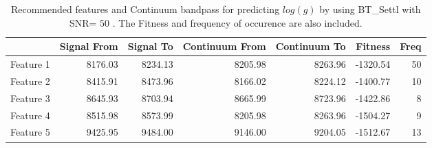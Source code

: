 \begin{table}
\begin{center}
\begin{tabular}{rrrrrrr}
  \hline
 & Signal From & Signal To & Continuum From & Continuum To & Fitness & Freq \\ 
  \hline
Feature 1 & 8176.03 & 8234.13 & 8205.98 & 8263.96 & -1320.54 &  50 \\ 
  Feature 2 & 8415.91 & 8473.96 & 8166.02 & 8224.12 & -1400.77 &  10 \\ 
  Feature 3 & 8645.93 & 8703.94 & 8665.99 & 8723.96 & -1422.86 &   8 \\ 
  Feature 4 & 8515.98 & 8573.99 & 8205.98 & 8263.96 & -1504.27 &   9 \\ 
  Feature 5 & 9425.95 & 9484.00 & 9146.00 & 9204.05 & -1512.67 &  13 \\ 
   \hline
\end{tabular}
\caption {Recommended features and Continuum bandpass for predicting $log(g)$ 
      by using BT\_Settl with SNR= $ 50 $ . 
      The Fitness and frequency of occurence are also included.} \label{tab:tab_SNR50_G} 
\end{center}
\end{table}

